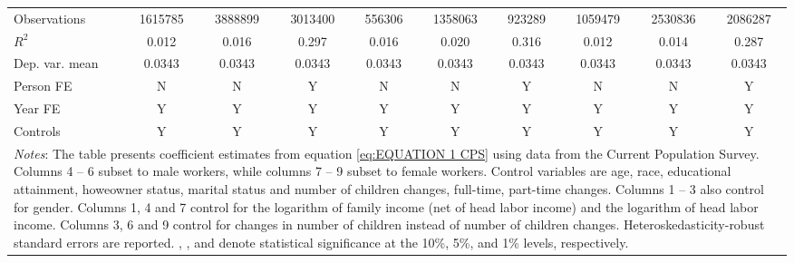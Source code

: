 {\begin{tabular}{l*{9}{c}}
\midrule
Observations        &     1615785         &     3888899         &     3013400         &      556306         &     1358063         &      923289         &     1059479         &     2530836         &     2086287         \\
\(R^{2}\)           &       0.012         &       0.016         &       0.297         &       0.016         &       0.020         &       0.316         &       0.012         &       0.014         &       0.287         \\
Dep. var. mean      &      0.0343         &      0.0343         &      0.0343         &      0.0343         &      0.0343         &      0.0343         &      0.0343         &      0.0343         &      0.0343         \\
Person FE           &           N         &           N         &           Y         &           N         &           N         &           Y         &           N         &           N         &           Y         \\
Year FE             &           Y         &           Y         &           Y         &           Y         &           Y         &           Y         &           Y         &           Y         &           Y         \\
Controls            &           Y         &           Y         &           Y         &           Y         &           Y         &           Y         &           Y         &           Y         &           Y         \\
\bottomrule
\multicolumn{10}{p{17cm}}{\footnotesize \textit{Notes}: The table presents coefficient estimates from equation \ref{eq:EQUATION 1 CPS} using data from the Current Population Survey. Columns 4 -- 6 subset to male workers, while columns 7 -- 9 subset to female workers. Control variables are age, race, educational attainment, howeowner status, marital status and number of children changes, full-time, part-time changes. Columns 1 -- 3 also control for gender. Columns 1, 4 and 7 control for the logarithm of family income (net of head labor income) and the logarithm of head labor income. Columns 3, 6 and 9 control for changes in number of children instead of number of children changes. Heteroskedasticity-robust standard errors are reported. \sym{*}, \sym{**}, and \sym{***} denote statistical significance at the 10\%, 5\%, and 1\% levels, respectively.}\\
\end{tabular}
}
